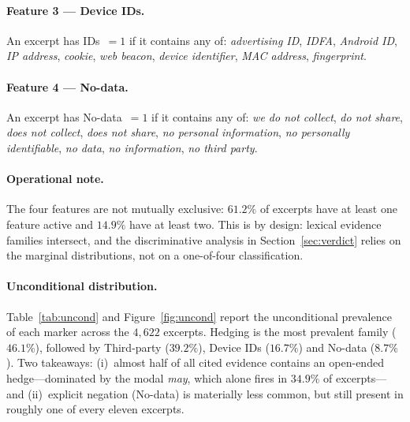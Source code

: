 \documentclass[11pt,a4paper]{article}
\begin{document}
\paragraph{Feature 3 --- Device IDs.}
An excerpt has IDs~$=1$ if it contains any of:
\emph{advertising ID}, \emph{IDFA}, \emph{Android ID}, \emph{IP
address}, \emph{cookie}, \emph{web beacon}, \emph{device identifier},
\emph{MAC address}, \emph{fingerprint}.

\paragraph{Feature 4 --- No-data.}
An excerpt has No-data~$=1$ if it contains any of:
\emph{we do not collect}, \emph{do not share}, \emph{does not collect},
\emph{does not share}, \emph{no personal information}, \emph{no
personally identifiable}, \emph{no data}, \emph{no information},
\emph{no third party}.

\paragraph{Operational note.} The four features are not mutually
exclusive: $61.2\%$ of excerpts have at least one feature active and
$14.9\%$ have at least two. This is by design: lexical evidence
families intersect, and the discriminative analysis in
Section~\ref{sec:verdict} relies on the marginal distributions, not
on a one-of-four classification.

\paragraph{Unconditional distribution.}
Table~\ref{tab:uncond} and Figure~\ref{fig:uncond} report the
unconditional prevalence of each marker across the $4{,}622$
excerpts. Hedging is the most prevalent family ($46.1\%$),
followed by Third-party ($39.2\%$), Device IDs ($16.7\%$) and
No-data ($8.7\%$). Two takeaways: (i)~almost half of all cited
evidence contains an open-ended hedge---dominated by the modal
\emph{may}, which alone fires in $34.9\%$ of excerpts---and
(ii)~explicit negation (No-data) is materially less common, but
still present in roughly one of every eleven excerpts.
\end{document}
